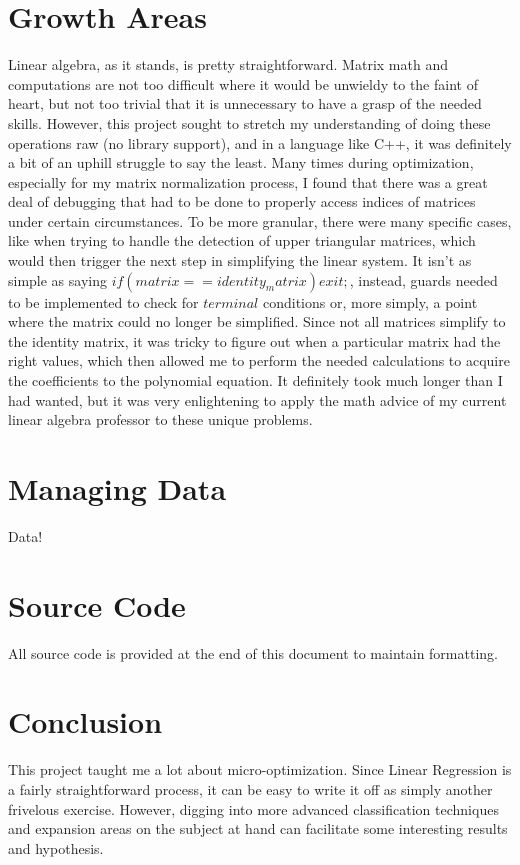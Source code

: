 \documentclass[11pt]{apa6}
\begin{document}
\section{Growth Areas}
Linear algebra, as it stands, is pretty straightforward. Matrix math and computations are not too difficult where it would be unwieldy to the faint of heart, but not too trivial that it is unnecessary to have a grasp of the needed skills. However,
this project sought to stretch my understanding of doing these operations raw (no library support), and in a language like C++, it was definitely a bit of an uphill struggle to say the least. Many times during optimization, especially for my matrix
normalization process, I found that there was a great deal of debugging that had to be done to properly access indices of matrices under certain circumstances. To be more granular, there were many specific cases, like when trying to handle the
detection of upper triangular matrices, which would then trigger the next step in simplifying the linear system. It isn't as simple as saying $if (matrix == identity_matrix) { exit; }$, instead, guards needed to be implemented to check for $terminal$
conditions or, more simply, a point where the matrix could no longer be simplified. Since not all matrices simplify to the identity matrix, it was tricky to figure out when a particular matrix had the right values, which then allowed me to perform
the needed calculations to acquire the coefficients to the polynomial equation. It definitely took much longer than I had wanted, but it was very enlightening to apply the math advice of my current linear algebra professor to these unique problems.

\section{Managing Data}
Data!

\section{Source Code}
All source code is provided at the end of this document to maintain formatting.

\section{Conclusion}
This project taught me a lot about micro-optimization. Since Linear Regression is a fairly straightforward process, it can be easy to write it off as simply another frivelous exercise. However, digging into more advanced classification techniques
and expansion areas on the subject at hand can facilitate some interesting results and hypothesis.
\end{document}
